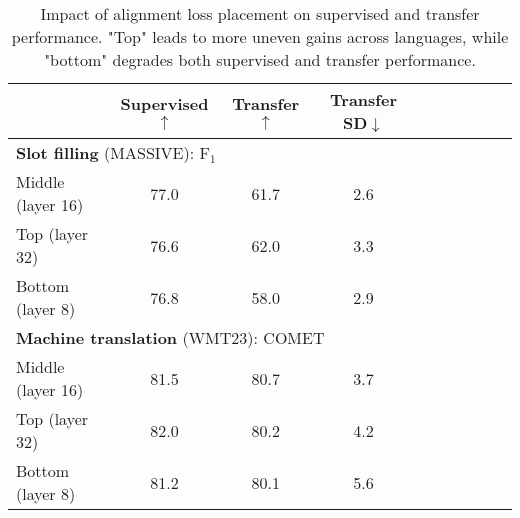 \begin{table}[t!]
    \small
    \centering
    \setlength\tabcolsep{2.2pt}
    \begin{tabular}{l c c c c c c ccc}
    \toprule
    &\textbf{Supervised{\tiny $\uparrow$}} 
    & \textbf{Transfer{\tiny $\uparrow$}}
    & \textbf{Transfer SD{\tiny $\downarrow$}} 
    \\
    \midrule
    \multicolumn{4}{l}{
    \textbf{Slot filling} (\textsc{MASSIVE}): F$_1$}  
    \\
    Middle (layer 16) &
    77.0 & 
    61.7 &
    2.6 %
    \\
    Top (layer 32) &
    76.6 & 
    62.0 &
    3.3 %
    \\
    Bottom (layer 8) &
    76.8 & 
    58.0 &
    2.9 %
    \\
    \midrule
    \multicolumn{4}{l}{
    \textbf{Machine translation} (\textsc{WMT}23): COMET
    } 
    \\
    Middle (layer 16) &
    81.5 & 
    80.7 &
    3.7 %
    \\
    Top (layer 32) &
    82.0 & 
    80.2 &
    4.2
    \\
    Bottom (layer 8) &
    81.2 & 
    80.1 &
    5.6
    \\
    \bottomrule
    \end{tabular}
    \caption{Impact of alignment loss placement on supervised and transfer performance. 
    "Top" leads to more uneven gains across languages,
    while "bottom" degrades both supervised and transfer performance.\label{tab:loss_position}}
\end{table}
